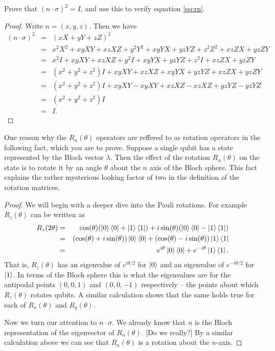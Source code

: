 \documentclass{article}
\begin{document}
\begin{exercise}
  Prove that $(n\cdot\sigma)^2=I$, and use this to verify equation \ref{eq:rn}.
  \begin{proof}
    Write $n=(x,y,z)$. Then we have
    \begin{eqnarray*}
      (n\cdot\sigma)^2&=&(xX+yY+zZ)^2 \\
      &=&x^2X^2+xyXY+xzXZ+y^2Y^2+xyYX+yzYZ+z^2Z^2+xzZX+yzZY \\
      &=&x^2I+xyXY+xzXZ+y^2I+xyYX+yzYZ+z^2I+xzZX+yzZY \\
      &=&(x^2+y^2+z^2)I+xyXY+xzXZ+xyYX+yzYZ+xzZX+yzZY \\
      &=&(x^2+y^2+z^2)I+xyXY-xyXY+xzXZ-xzXZ+yzYZ-yzYZ \\
      &=&(x^2+y^2+z^2)I \\
      &=& I.
    \end{eqnarray*}
  \end{proof}
\end{exercise}

\begin{exercise}
  One reason why the $R_n(\theta)$ operators are reffered to as rotation operators in the following fact, which you are to prove. Suppose a single qubit has a state represented by the Bloch vector $\lambda$. Then the effect of the rotation $R_n(\theta)$ on the state is to rotate it by an angle $\theta$ about the $n$ axis of the Bloch sphere. This fact explains the rather mysterious looking factor of two in the definition of the rotation matrices.
  \begin{proof}
    We will begin with a deeper dive into the Pauli rotations. For example $R_z(\theta)$ can be written as
    \begin{eqnarray*}
      R_z(2\theta)&=&\cos(\theta)(\ket{0}\bra{0}+\ket{1}\bra{1})+i\sin(\theta)(\ket{0}\bra{0}-\ket{1}\bra{1}) \\
      &=&(\cos(\theta)+i\sin(\theta))\ket{0}\bra{0}+(\cos(\theta)-i\sin(\theta))\ket{1}\bra{1} \\
      &=&e^{i\theta}\ket{0}\bra{0}+e^{-i\theta}\ket{1}\bra{1}.
    \end{eqnarray*}
    That is, $R_z(\theta)$ has an eigenvalue of $e^{i\theta/2}$ for $\ket{0}$ and an eigenvalue of $e^{-i\theta/2}$ for $\ket{1}$. In terms of the Bloch sphere this is what the eigenvalues are for the antipodal points $(0,0,1)$ and $(0,0,-1)$ respectively -- the points about which $R_z(\theta)$ rotates qubits. A similar calculation shows that the same holds true for each of $R_x(\theta)$ and $R_y(\theta)$.

    Now we turn our attention to $n\cdot\sigma$. We already know that $n$ is the Bloch representation of the eigenvector of $R_n(\theta)$. [Do we really?] By a similar calculation above we can see that $R_n(\theta)$ is a rotation about the $n$-axis.
  \end{proof}
\end{exercise}
\end{document}
